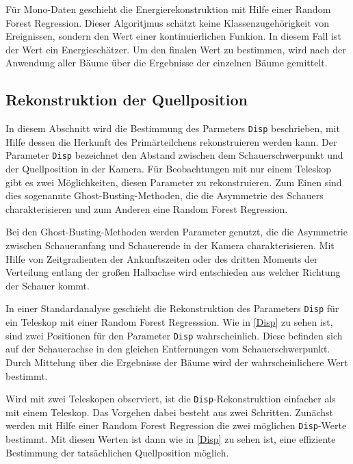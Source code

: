 Für Mono-Daten geschieht die Energierekonstruktion mit Hilfe einer Random Forest Regression.
Dieser Algoritjmus schätzt keine Klassenzugehörigkeit von Ereignissen, sondern den Wert einer kontinuierlichen Funkion. 
In diesem Fall ist der Wert ein Energieschätzer.
Um den finalen Wert zu bestimmen, wird nach der Anwendung aller Bäume über die Ergebnisse der einzelnen Bäume gemittelt.\cite{EnergieRekonstruktion} 


\subsection{Rekonstruktion der Quellposition}
In diesem Abschnitt wird die Bestimmung des Parmeters \texttt{Disp} beschrieben, mit Hilfe dessen die Herkunft des Primärteilchens rekonstruieren werden kann. 
Der Parameter \texttt{Disp} bezeichnet den Abstand zwischen dem Schauerschwerpunkt und der Quellposition in der Kamera.
Für Beobachtungen mit nur einem Teleskop gibt es zwei Möglichkeiten, diesen Parameter zu rekonstruieren. 
Zum Einen sind dies sogenannte Ghost-Busting-Methoden, die die Asymmetrie des Schauers charakterisieren und zum Anderen eine Random Forest Regression.\cite{DispRekonstruktion}

Bei den Ghost-Busting-Methoden werden Parameter genutzt, die die Asymmetrie zwischen Schaueranfang und Schauerende in der Kamera charakterisieren.
Mit Hilfe von Zeitgradienten der Ankunftszeiten oder des dritten Moments der Verteilung entlang der großen Halbachse wird entschieden aus welcher Richtung der Schauer kommt.\cite{DispRekonstruktion}

In einer Standardanalyse geschieht die Rekonstruktion des Parameters \texttt{Disp} für ein Teleskop mit einer Random Forest Regresssion.
Wie in \autoref{Disp} zu sehen ist, sind zwei Positionen für den Parameter \texttt{Disp} wahrscheinlich.
Diese befinden sich auf der Schauerachse in den gleichen Entfernungen vom Schauerschwerpunkt.
Durch Mittelung über die Ergebnisse der Bäume wird der wahrscheinlichere Wert bestimmt.\cite{DispRekonstruktion}

Wird mit zwei Teleskopen observiert, ist die \texttt{Disp}-Rekonstruktion einfacher als mit einem Teleskop.
Das Vorgehen dabei besteht aus zwei Schritten.
Zunächst werden mit Hilfe einer Random Forest Regression die zwei möglichen \texttt{Disp}-Werte bestimmt.
Mit diesen Werten ist dann wie in \autoref{Disp} zu sehen ist, eine effiziente Bestimmung der tatsächlichen Quellposition möglich.

